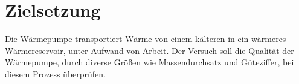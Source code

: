 \section{Zielsetzung}
Die Wärmepumpe transportiert Wärme von einem kälteren in ein wärmeres Wärmereservoir,
unter Aufwand von Arbeit. Der Versuch soll die Qualität der Wärmepumpe, durch diverse Größen wie Massendurchsatz und
Güteziffer, bei diesem Prozess überprüfen.
\label{sec:Zielsetzung}
